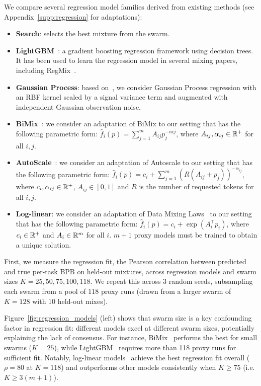 We compare several regression model families derived from existing methods (see Appendix~\ref{supp:regression} for adaptations):
\begin{itemize}[itemsep=0.00pt,topsep=0pt,leftmargin=10pt]
    \item \textbf{Search}: selects the best mixture from the swarm.
    \item \textbf{LightGBM}~\citep{lightgbm}: a gradient boosting regression framework using decision trees. It has been used to learn the regression model in several mixing papers, including RegMix~\citep{liu2025regmixdatamixtureregression, wettig2025organizewebconstructingdomains, diao2025climbclusteringbasediterativedata}.
    \item \textbf{Gaussian Process}: based on~\cite{chen2025admirebayesoptaccelerateddatamixture}, we consider Gaussian Process regression with an RBF kernel scaled by a signal variance term and augmented with independent Gaussian observation noise.
    \item \textbf{BiMix}~\citep{ge2025bimixbivariatedatamixing}: we consider an adaptation of BiMix to our setting that has the following parametric form: $\hat{f}_i(p) = \sum_{j = 1}^m A_{ij} p_j^{-\alpha{ij}}$, where $A_{ij}, \alpha_{ij} \in \mathbb{R}^+$ for all $i, j$. 
    \item \textbf{AutoScale}~\citep{kang2025autoscalescaleawaredatamixing}: we consider an adaptation of Autoscale to our setting that has the following parametric form: $\hat{f}_i(p) = c_i + \sum_{j = 1}^m (R(A_{ij} + p_j))^{-\alpha_{ij}}$, where $c_i, \alpha_{ij} \in \mathbb{R}^+$, $A_{ij} \in [0, 1]$ and $R$ is the number of requested tokens for all $i, j$. 
    \item \textbf{Log-linear}: we consider an adaptation of Data Mixing Laws~\citep{ye2025datamixinglawsoptimizing} to our setting that has the following parametric form: $\hat{f}_i(p) = c_i + \exp(A_i^\top p_i)$, where $c_i \in \mathbb{R}^+$ and $A_i \in \mathbb{R}^m$ for all $i$. $m+1$ proxy models must be trained to obtain a unique solution.
\end{itemize}

First, we measure the regression fit, the Pearson correlation between predicted and true per-task BPB on held-out mixtures, across regression models and swarm sizes $K= 25, 50, 75, 100, 118$. We repeat this across 3 random seeds, subsampling each swarm from a pool of $118$ proxy runs (drawn from a larger swarm of $K=128$ with $10$ held-out mixes).


Figure~\ref{fig:regression_models} (left) shows that swarm size is a key confounding factor in regression fit: different models excel at different swarm sizes, potentially explaining the lack of consensus. For instance, BiMix~\citep{ge2025bimixbivariatedatamixing} performs the best for small swarms ($K=25$), while LightGBM~\citep{liu2025regmixdatamixtureregression} requires more than 118 proxy runs for sufficient fit. Notably, log-linear models~\citep{ye2025datamixinglawsoptimizing} achieve the best regression fit overall ($\rho=80$ at $K=118$) and outperforms other models consistently when  $K \ge 75$ (i.e. $K \ge 3(m+1)$).

